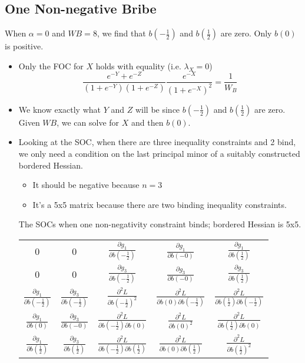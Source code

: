 \documentclass[12pt]{article}
\newcommand{\al}{\alpha}
\begin{document}
\subsection{One Non-negative Bribe}
When $\al = 0$ and $WB=8$, we find that $b\left(-\frac{1}{2}\right)$ and $b\left(\frac{1}{2}\right)$ are zero. Only $b(0)$ is positive.
\begin{itemize}
	\item Only the FOC for $X$ holds with equality (i.e. $\lambda_X = 0$)
		\[
			\frac{e^{-Y} + e^{-Z}}{\left(1+e^{-Y}\right)\left(1+e^{-Z}\right)} \frac{e^{-X}}{\left(1+e^{-X}\right)^2}= \frac{1}{W_B}
		\]
	\item We know exactly what $Y$ and $Z$ will be since $b\left(-\frac{1}{2}\right)$ and $b\left(\frac{1}{2}\right)$ are zero. Given $WB$, we can solve for $X$ and then $b(0)$.
	\item Looking at the SOC, when there are three inequality constraints and 2 bind, we only need a condition on the last principal minor of a suitably constructed bordered Hessian.
		\begin{itemize}
			\item It should be negative because $n=3$
			\item It's a 5x5 matrix because there are two binding inequality constraints.
		\end{itemize}
		The SOCs when one non-negativity constraint binds; bordered Hessian is 5x5. \\
		\begin{tabular}{ccccc}
			0 & 0 & $\frac{\partial g_1}{\partial b\left(-\frac{1}{2}\right)}$ & $\frac{\partial g_1}{\partial b\left(-0\right)}$ & $\frac{\partial g_1}{\partial b\left(\frac{1}{2}\right)}$ \\
			0 & 0 & $\frac{\partial g_3}{\partial b\left(-\frac{1}{2}\right)}$ & $\frac{\partial g_3}{\partial b\left(-0\right)}$ & $\frac{\partial g_3}{\partial b\left(\frac{1}{2}\right)}$ \\
			$\frac{\partial g_1}{\partial b\left(-\frac{1}{2}\right)}$ & $\frac{\partial g_3}{\partial b\left(-\frac{1}{2}\right)}$& $\frac{\partial^2 L}{\partial b\left(-\frac{1}{2}\right)^2}$ & $\frac{\partial^2 L}{\partial b(0)\partial b\left(-\frac{1}{2}\right)}$ & $\frac{\partial^2 L}{\partial b\left(\frac{1}{2}\right)\partial b\left(-\frac{1}{2}\right)}$  \\
			$\frac{\partial g_1}{\partial b\left(0\right)}$ & $\frac{\partial g_3}{\partial b\left(-0\right)}$ & $\frac{\partial^2 L}{\partial b\left(-\frac{1}{2}\right)\partial b\left(0\right)}$ & $\frac{\partial^2 L}{\partial b(0)^2}$ & $\frac{\partial^2 L}{\partial b\left(\frac{1}{2}\right)\partial b\left(0\right)}$ \\
			$\frac{\partial g_1}{\partial b\left(\frac{1}{2}\right)}$ & $\frac{\partial g_3}{\partial b\left(\frac{1}{2}\right)}$ & $\frac{\partial^2 L}{\partial b\left(-\frac{1}{2}\right)\partial b\left(\frac{1}{2}\right)}$ & $\frac{\partial^2 L}{\partial b(0) \partial b\left(\frac{1}{2}\right)}$ & $\frac{\partial^2 L}{\partial b\left(\frac{1}{2}\right)^2}$
		\end{tabular} \\


\end{itemize}
\end{document}
